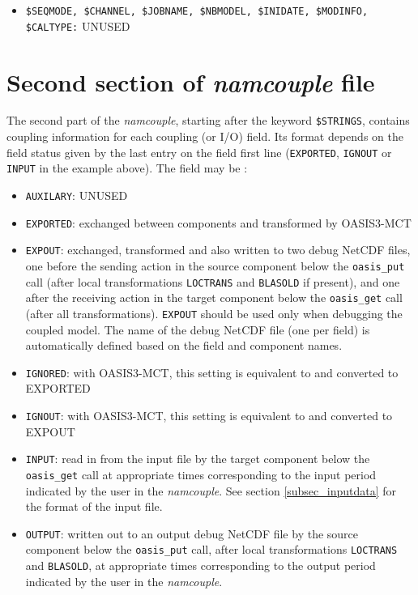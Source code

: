\begin{itemize}
\item {\tt \$SEQMODE, \$CHANNEL, \$JOBNAME, \$NBMODEL, \$INIDATE, \$MODINFO, \$CALTYPE:} UNUSED

\end{itemize}


\section{Second section of {\it namcouple} file }
\label{subsec_namcouplesecond}

The second part of the {\it namcouple}, starting after the keyword
{\tt \$STRINGS}, contains coupling information for each coupling (or
I/O) field.  Its format depends on the field status given by the last
entry on the field first line ({\tt EXPORTED}, {\tt IGNOUT} or {\tt
  INPUT} in the example above). The field may be :

\begin{itemize}
\item {\tt AUXILARY}: UNUSED
\item {\tt EXPORTED}: exchanged between components and
  transformed by OASIS3-MCT
\item {\tt EXPOUT}: exchanged, transformed and also written to two
  debug NetCDF files, one before the sending action in the source
  component below the {\tt oasis\_put} call (after local transformations
  {\tt LOCTRANS} and {\tt BLASOLD} if present), and one after the
  receiving action in the target component below the {\tt oasis\_get} call
  (after all transformations). {\tt EXPOUT} should be used only when
  debugging the coupled model. The name of the debug NetCDF file
  (one per field) is automatically defined based on the field and
  component names.
\item {\tt IGNORED}: with OASIS3-MCT, this setting is equivalent to
  and converted to EXPORTED
\item {\tt IGNOUT}: with OASIS3-MCT, this setting is equivalent to and
  converted to EXPOUT
\item {\tt INPUT}: read in from the input file by the target component
  below the {\tt oasis\_get} call at
  appropriate times corresponding to the input period indicated by the
  user in the {\it namcouple}. See section \ref{subsec_inputdata} for
  the format of the input file.
\item {\tt OUTPUT}: written out to an output debug NetCDF file by the
  source component below the {\tt oasis\_put} call, after local
  transformations {\tt LOCTRANS} and {\tt BLASOLD}, at appropriate
  times corresponding to the output period indicated by the user in
  the {\it namcouple}.

\end{itemize}

